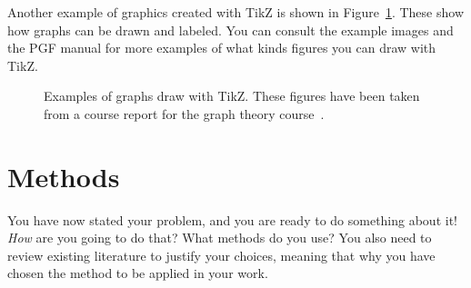 \documentclass[12pt,a4paper,oneside,pdftex]{report}
\begin{document}
Another example of graphics created with TikZ is shown in
Figure~\ref{fig:tikz-examples}.
These show how graphs can be drawn and labeled.
You can consult the example images and the PGF manual for more examples of what
kinds figures you can draw with TikZ.

\newlength{\graphdotsize}
\setlength{\graphdotsize}{1.7pt}
\newlength{\graphgridsize}
\setlength{\graphgridsize}{1.2em}
\begin{figure}[ht]
\begin{center}
\caption{Examples of graphs draw with TikZ. These figures have been taken from a
course report for the graph theory course~\cite{FerryProblem}.}
\label{fig:tikz-examples}
\end{center}
\end{figure}



% 

\chapter{Methods}
\label{chapter:methods}

You have now stated your problem, and you are ready to do something
about it!  \emph{How} are you going to do that? What methods do you
use?  You also need to review existing literature to justify your
choices, meaning that why you have chosen the method to be applied in
your work.
\end{document}
